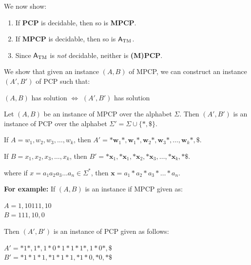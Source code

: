 \begin{frame}
We now show:

\begin{enumerate}
\item  If {\bf PCP} is decidable, then so is {\bf MPCP}.
\item  If {\bf MPCP} is decidable, then so is $\mathsf{A}_{\mathrm{TM}}$.
\item  Since $\mathsf{A}_{\mathrm{TM}}$ is {\em not} decidable, neither is {\bf (M)PCP}.
\end{enumerate}
\end{frame}

\begin{frame}
\begin{center}
\end{center}

We show that given an instance $(A,B)$ of MPCP, we
can construct an instance $(A',B')$ of PCP such that:
\begin{center}
$(A,B)$ has solution $\iff$ $(A',B')$ has solution
\end{center}

Let $(A,B)$ be an instance of MPCP over the alphabet $\Sigma$.  Then
$(A',B')$ is an instance of PCP over the alphabet
$\Sigma'=\Sigma\cup\{*,\$\}$.

If $A=w_1,w_2,w_3,\ldots,w_k$, then 
$A'=*\textbf{w}_1*,\textbf{w}_1*,\textbf{w}_2*,\textbf{w}_3*,
\ldots,\textbf{w}_k*,\$$.

If $B=x_1,x_2,x_3,\ldots,x_k$, then
$B'=*\textbf{x}_1,*\textbf{x}_1,*\textbf{x}_2,*\textbf{x}_3,
\ldots,*\textbf{x}_k,*\$$.

where if $x=a_1a_2a_3\ldots a_n\in\Sigma^*$, then
$\textbf{x}=a_1*a_2*a_3*\ldots*a_n$.
\end{frame}

\begin{frame}

{\bf For example:} If $(A,B)$ is an instance if MPCP given as:

$A=1,10111,10$ \\
$B=111,10,0$

Then $(A',B')$ is an instance of PCP given as follows:

$A'=*1*,1*,1*0*1*1*1*,1*0*,\$$ \\
$B'=*1*1*1,*1*1*1,*1*0,*0,*\$$
\end{frame}

